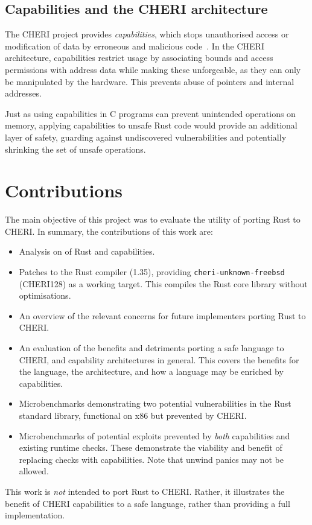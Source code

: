 \documentclass[dissertation.tex]{subfiles}
\begin{document}
\subsection{Capabilities and the CHERI architecture}
The CHERI project provides \emph{capabilities}, which stops unauthorised access or modification of data by erroneous and malicious code~\cite{cheri-v6}.
In the CHERI architecture, capabilities restrict usage by associating bounds and access permissions with address data while making these unforgeable, as they can only be manipulated by the hardware.
This prevents abuse of pointers and internal addresses.

Just as using capabilities in C programs can prevent unintended operations on memory, applying capabilities to unsafe Rust code would provide an additional layer of safety, guarding against undiscovered vulnerabilities and potentially shrinking the set of unsafe operations.


\section{Contributions}
\label{sec:intro-contrib}

The main objective of this project was to evaluate the utility of
porting Rust to CHERI.
In summary, the contributions of this work are:

\begin{itemize}
    \item Analysis on  of Rust and capabilities.
    \item Patches to the Rust compiler (1.35), providing
    \texttt{cheri-unknown-freebsd} (CHERI128) as a working target.
    This compiles the Rust core library without optimisations.
    \item An overview of the relevant concerns for future implementers
    porting Rust to CHERI. 
    \item An evaluation of the benefits and detriments porting a safe
    language to CHERI, and capability architectures in general.
    This covers the benefits for the language, the architecture, and how
    a language may be enriched by capabilities.
    \item Microbenchmarks demonstrating two potential vulnerabilities in
    the Rust standard library, functional on x86 but prevented by CHERI.
    \item Microbenchmarks of potential exploits prevented by \emph{both}
    capabilities and existing runtime checks. These demonstrate the
    viability and benefit of replacing checks with capabilities. Note
    that unwind panics may not be allowed.
\end{itemize}

This work is \emph{not} intended to port Rust to CHERI.
Rather, it illustrates the benefit of CHERI capabilities to a safe
language, rather than providing a full implementation.
\end{document}
